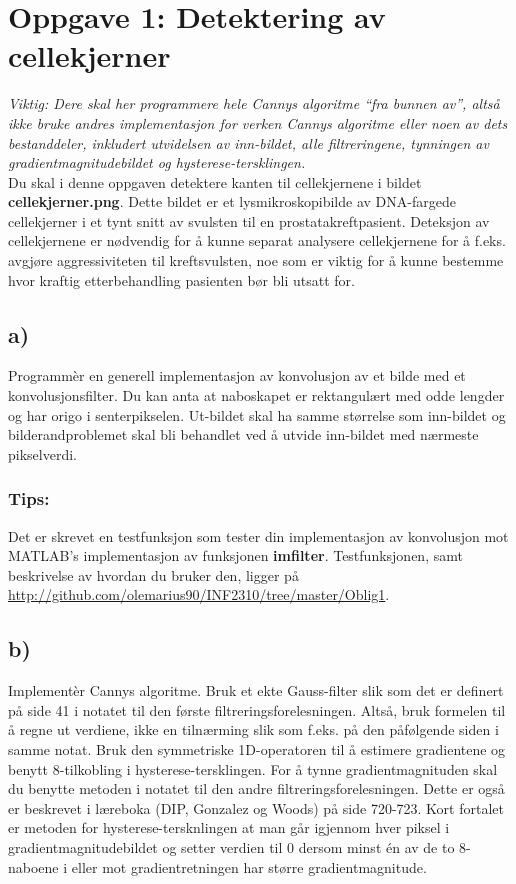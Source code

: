 \documentclass[11pt,a4paper]{article}
\begin{document}
\newpage

\section*{Oppgave 1: Detektering av cellekjerner}
\textit{Viktig: Dere skal her programmere hele Cannys algoritme “fra bunnen av”, altså
ikke bruke andres implementasjon for verken Cannys algoritme eller noen av dets
bestanddeler, inkludert utvidelsen av inn-bildet, alle filtreringene, tynningen av
gradientmagnitudebildet og hysterese-tersklingen.}
\\

Du skal i denne oppgaven detektere kanten til cellekjernene i bildet \\\textbf{cellekjerner.png}.
Dette bildet er et lysmikroskopibilde av DNA-fargede cellekjerner i et tynt snitt av
svulsten til en prostatakreftpasient. Deteksjon av cellekjernene er nødvendig for å
kunne separat analysere cellekjernene for å f.eks. avgjøre aggressiviteten til
kreftsvulsten, noe som er viktig for å kunne bestemme hvor kraftig etterbehandling
pasienten bør bli utsatt for.
\subsection*{a)}
Programmèr en generell implementasjon av konvolusjon av et bilde med et
konvolusjonsfilter. Du kan anta at naboskapet er rektangulært med odde
lengder og har origo i senterpikselen. Ut-bildet skal ha samme størrelse som
inn-bildet og bilderandproblemet skal bli behandlet ved å utvide inn-bildet med
nærmeste pikselverdi.
\subsubsection*{Tips:}
Det er skrevet en testfunksjon som tester din implementasjon av konvolusjon mot MATLAB's implementasjon av funksjonen
\textbf{imfilter}. Testfunksjonen, samt beskrivelse av hvordan du bruker den, ligger på \\
\href{http://github.com/olemarius90/INF2310/tree/master/Oblig1}{http://github.com/olemarius90/INF2310/tree/master/Oblig1}.

\subsection*{b)} 
Implementèr Cannys algoritme. Bruk et ekte Gauss-filter slik som det er
definert på side 41 i notatet til den første filtreringsforelesningen. Altså, bruk formelen
til å regne ut verdiene, ikke en tilnærming slik som f.eks. på den påfølgende siden i samme
notat. Bruk den symmetriske 1D-operatoren til å estimere gradientene og benytt 8-tilkobling i
hysterese-tersklingen. For å tynne gradientmagnituden skal du benytte metoden
i notatet til den andre filtreringsforelesningen. Dette er også er beskrevet i
læreboka (DIP, Gonzalez og Woods) på side 720-723. Kort fortalet er metoden for hysterese-tersknlingen
at man går igjennom hver piksel i gradientmagnitudebildet og setter verdien til 0 dersom minst én av 
de to 8-naboene i eller mot gradientretningen har større gradientmagnitude.
\end{document}
